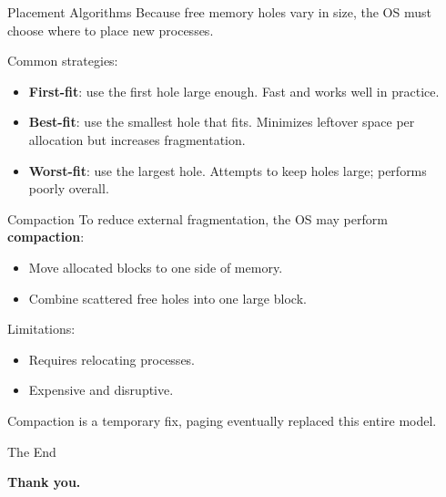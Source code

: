 \documentclass[11pt]{beamer}
\begin{document}
    \begin{frame}[t]{Placement Algorithms}
        Because free memory holes vary in size, the OS must choose where to place new processes.

        \medskip

        Common strategies:
        \begin{itemize}
            \item \textbf{First-fit}: use the first hole large enough.
            Fast and works well in practice.
            \item \textbf{Best-fit}: use the smallest hole that fits.
            Minimizes leftover space per allocation but increases fragmentation.
            \item \textbf{Worst-fit}: use the largest hole.
            Attempts to keep holes large; performs poorly overall.
        \end{itemize}
    \end{frame}



    \begin{frame}[t]{Compaction}
        To reduce external fragmentation, the OS may perform \textbf{compaction}:
        \begin{itemize}
            \item Move allocated blocks to one side of memory.
            \item Combine scattered free holes into one large block.
        \end{itemize}

        \medskip

        Limitations:
        \begin{itemize}
            \item Requires relocating processes.
            \item Expensive and disruptive.
        \end{itemize}

        Compaction is a temporary fix, paging eventually replaced this entire model.
    \end{frame}


    \begin{frame}[t]{The End}
        \begin{center}
            \vfill
            \textbf{\Huge Thank you.}
            \vfill
        \end{center}
    \end{frame}
\end{document}
